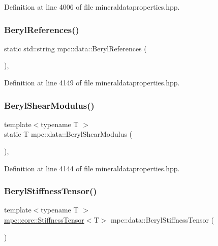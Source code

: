 Definition at line 4006 of file mineraldataproperties.\+hpp.

\mbox{\label{namespacempc_1_1data_ad766b9fe706721bb870ddd9d38448fc5}} 
\subsubsection{\texorpdfstring{Beryl\+References()}{BerylReferences()}}
{\footnotesize\ttfamily static std\+::string mpc\+::data\+::\+Beryl\+References (\begin{DoxyParamCaption}{ }\end{DoxyParamCaption})\hspace{0.3cm}{\ttfamily [inline]}, {\ttfamily [static]}}



Definition at line 4149 of file mineraldataproperties.\+hpp.

\mbox{\label{namespacempc_1_1data_a30ababb5af7a05ca85d1f618db65e9c9}} 
\subsubsection{\texorpdfstring{Beryl\+Shear\+Modulus()}{BerylShearModulus()}}
{\footnotesize\ttfamily template$<$typename T $>$ \\
static T mpc\+::data\+::\+Beryl\+Shear\+Modulus (\begin{DoxyParamCaption}{ }\end{DoxyParamCaption})\hspace{0.3cm}{\ttfamily [inline]}, {\ttfamily [static]}}



Definition at line 4144 of file mineraldataproperties.\+hpp.

\mbox{\label{namespacempc_1_1data_aacaabd24970e6e0e2d7d3d4f59fc03cf}} 
\subsubsection{\texorpdfstring{Beryl\+Stiffness\+Tensor()}{BerylStiffnessTensor()}}
{\footnotesize\ttfamily template$<$typename T $>$ \\
\mbox{\hyperlink{structmpc_1_1core_1_1_stiffness_tensor}{mpc\+::core\+::\+Stiffness\+Tensor}}$<$T$>$ mpc\+::data\+::\+Beryl\+Stiffness\+Tensor (\begin{DoxyParamCaption}{ }\end{DoxyParamCaption})}



